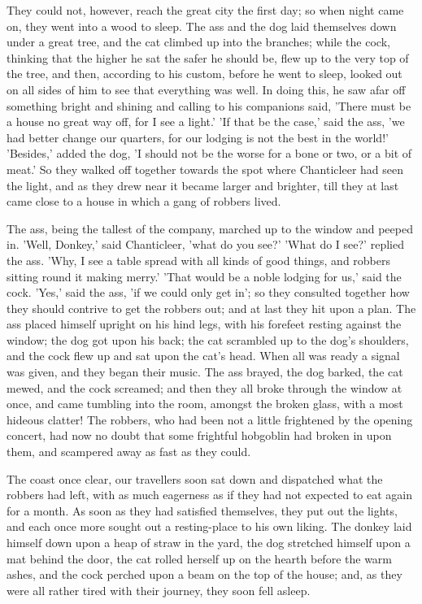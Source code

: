 \documentclass[12pt]{book}
\begin{document}
They could not, however, reach the great city the first day; so when
night came on, they went into a wood to sleep. The ass and the dog
laid themselves down under a great tree, and the cat climbed up into
the branches; while the cock, thinking that the higher he sat the
safer he should be, flew up to the very top of the tree, and then,
according to his custom, before he went to sleep, looked out on all
sides of him to see that everything was well. In doing this, he saw
afar off something bright and shining and calling to his companions
said, 'There must be a house no great way off, for I see a light.' 'If
that be the case,' said the ass, 'we had better change our quarters,
for our lodging is not the best in the world!' 'Besides,' added the
dog, 'I should not be the worse for a bone or two, or a bit of meat.'
So they walked off together towards the spot where Chanticleer had
seen the light, and as they drew near it became larger and brighter,
till they at last came close to a house in which a gang of robbers
lived.

The ass, being the tallest of the company, marched up to the window
and peeped in. 'Well, Donkey,' said Chanticleer, 'what do you see?'
'What do I see?' replied the ass. 'Why, I see a table spread with all
kinds of good things, and robbers sitting round it making merry.'
'That would be a noble lodging for us,' said the cock. 'Yes,' said the
ass, 'if we could only get in'; so they consulted together how they
should contrive to get the robbers out; and at last they hit upon a
plan. The ass placed himself upright on his hind legs, with his
forefeet resting against the window; the dog got upon his back; the
cat scrambled up to the dog's shoulders, and the cock flew up and sat
upon the cat's head. When all was ready a signal was given, and they
began their music. The ass brayed, the dog barked, the cat mewed, and
the cock screamed; and then they all broke through the window at once,
and came tumbling into the room, amongst the broken glass, with a most
hideous clatter! The robbers, who had been not a little frightened by
the opening concert, had now no doubt that some frightful hobgoblin
had broken in upon them, and scampered away as fast as they could.

The coast once clear, our travellers soon sat down and dispatched what
the robbers had left, with as much eagerness as if they had not
expected to eat again for a month. As soon as they had satisfied
themselves, they put out the lights, and each once more sought out a
resting-place to his own liking. The donkey laid himself down upon a
heap of straw in the yard, the dog stretched himself upon a mat behind
the door, the cat rolled herself up on the hearth before the warm
ashes, and the cock perched upon a beam on the top of the house; and,
as they were all rather tired with their journey, they soon fell
asleep.
\end{document}

